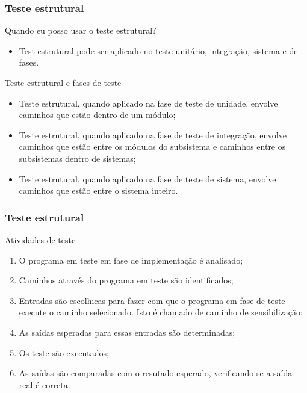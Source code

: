 \begin{frame}
\frametitle{Teste estrutural}

\begin{block:fact}{Quando eu posso usar o teste estrutural?}
\begin{itemize}
	\item Test estrutural pode ser aplicado no teste unitário, integração, sistema e de fases.
\end{itemize}
\end{block:fact}


\begin{block:fact}{Teste estrutural e fases de teste}
\begin{itemize}
	\item Teste estrutural, quando aplicado na fase de teste de unidade, envolve caminhos que estão dentro de um módulo;

	\item Teste estrutural, quando aplicado na fase de teste de integração, envolve caminhos que estão entre os módulos do subsistema e caminhos entre os subsistemas dentro de sistemas;

	\item Teste estrutural, quando aplicado na fase de teste de sistema, envolve caminhos que estão entre o sistema inteiro.
	
\end{itemize}
\end{block:fact}
\end{frame}


\begin{frame}
\frametitle{Teste estrutural}

\begin{block:procedure}{Atividades de teste}
\begin{enumerate}
	\item O programa em teste em fase de implementação é analisado;
	\item Caminhos através do programa em teste são identificados;
	\item Entradas são escolhicas para fazer com que o programa em fase de teste execute o caminho selecionado. Isto é chamado de caminho de sensibilização;
	\item As saídas esperadas para essas entradas são determinadas;
	\item Os teste são executados;
	\item As saídas são comparadas com o resutado esperado, verificando se a saída real é correta.
\end{enumerate}
\end{block:procedure}
\end{frame}